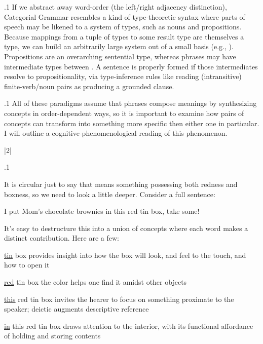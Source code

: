 \documentclass[11pt, twocolumn]{article}
\begin{document}
{{\p.1{%
If we abstract away word-order (the left/right adjacency distinction),
Categorial Grammar resembles a kind of type-theoretic syntax
where parts of speech may be likened to a system of types,
such as nouns and propositions. Because mappings from a tuple
of types to some result type are themselves a type,
we can build an arbitrarily large system
out of a small basis (e.g., \nslashp{}).
Propositions are an overarching sentential type,
whereas phrases may have intermediate types between
\pANDn{}. A sentence is properly
formed if those intermediates resolve to propositionality,
via type-inference rules like reading (intransitive)
finite-verb/noun
pairs as producing a grounded clause.
}%

\p.1{%
All of these paradigms assume that phrases compose
meanings by synthesizing concepts in order-dependent
ways, so it is important to examine how pairs of
concepts can transform into something more specific
then either one in particular. I will outline a
cognitive-phenomenological reading of this phenomenon. \vspace{6pt}
}%


\s|2|{}

\p.1{%
It is circular just
to say that  means something possessing
both redness and boxness, so we need to look a
little deeper. Consider a full sentence:

\begin{exsGroup}

\exsItem{}  I put Mom's chocolate brownies in this red tin box, take some!

\end{exsGroup}

\nip{}%
It's easy to destructure this into a union of concepts where
each word makes a distinct contribution. Here are a few:

\begin{itemz}

\symItem{}   \underline{tin} box \sarr{}  \pgl{}provides insight
into how the box will look, and
feel to the touch, and how to open it
 
\symItem{}   \underline{red} tin box \sarr{}  the color helps one find it amidst other objects
 
\symItem{}   \underline{this} red tin box \sarr{}  invites the hearer to focus on something proximate
to the speaker; deictic augments descriptive reference
 
\symItem{}   \underline{in} this red tin box \sarr{}  draws attention to the interior, with its functional
affordance of holding and storing contents
 

\end{itemz}}}}
\end{document}
